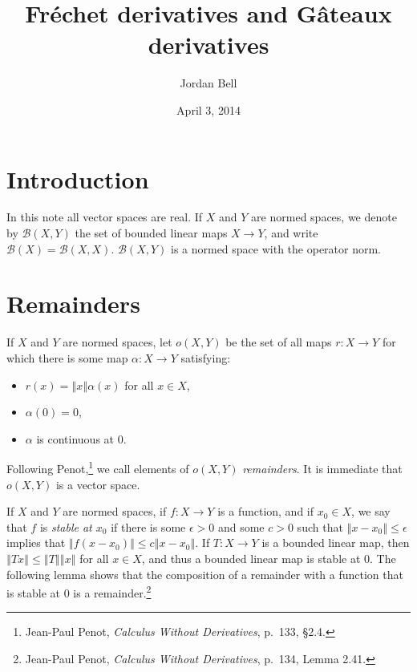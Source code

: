 \documentclass{article}
\newcommand{\norm}[1]{\left\Vert #1 \right\Vert}
\theoremstyle{definition}
\theoremstyle{definition}
\begin{document}
\title{Fr\'echet derivatives and G\^ateaux derivatives}
\author{Jordan Bell}
\date{April 3, 2014}

\maketitle

\section{Introduction}
In this note all vector spaces are real.
 If $X$ and $Y$ are normed spaces,
we denote by $\mathscr{B}(X,Y)$ the set of bounded linear maps $X \to Y$, and write $\mathscr{B}(X)=\mathscr{B}(X,X)$.
$\mathscr{B}(X,Y)$ is a normed space with the operator norm.


\section{Remainders}
If $X$ and $Y$ are normed spaces, let $o(X,Y)$ be the set of all maps $r:X \to Y$ 
for which there is some map $\alpha:X \to Y$ satisfying:
\begin{itemize}
\item $r(x)=\norm{x}\alpha(x)$ for all $x \in X$,
\item $\alpha(0)=0$,
\item $\alpha$ is continuous at $0$.
\end{itemize}
Following
Penot,\footnote{Jean-Paul Penot, {\em Calculus Without Derivatives}, p.~133, \S 2.4.} we call elements of $o(X,Y)$ {\em remainders}.
It is immediate that $o(X,Y)$ is a vector space.

If $X$ and $Y$ are normed spaces, if $f:X \to Y$ is a function, and if $x_0 \in X$, we say that $f$ is {\em stable at $x_0$} if there is some
$\epsilon>0$ and some $c>0$ such that $\norm{x-x_0} \leq \epsilon$ implies that $\norm{f(x-x_0)} \leq c \norm{x-x_0}$.
If $T:X \to Y$ is a bounded linear map, then $\norm{Tx} \leq \norm{T} \norm{x}$ for all $x \in X$, and thus a bounded linear map
is stable at $0$. The following lemma shows that the composition of  a remainder with a function that is stable at $0$ is a remainder.\footnote{Jean-Paul
Penot, {\em Calculus Without Derivatives}, p.~134, Lemma 2.41.}
\end{document}
